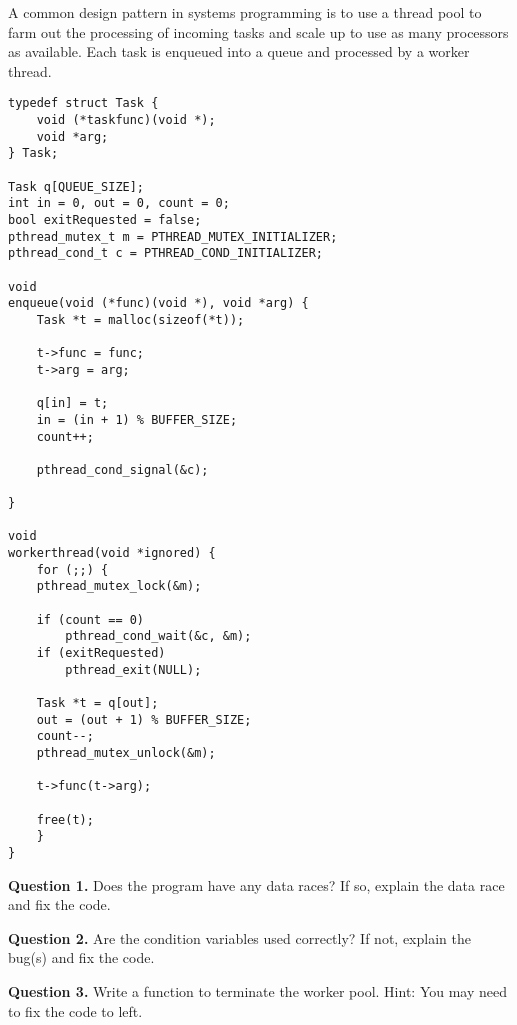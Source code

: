\documentclass[letterpaper,twocolumn,10pt]{article}
\begin{document}
A common design pattern in systems programming is to use a thread pool to farm 
out the processing of incoming tasks and scale up to use as many processors as 
available.  Each task is enqueued into a queue and processed by a worker 
thread.

\begin{lstlisting}[style=CStyle]
typedef struct Task {
    void (*taskfunc)(void *);
    void *arg;
} Task;

Task q[QUEUE_SIZE];
int in = 0, out = 0, count = 0;
bool exitRequested = false;
pthread_mutex_t m = PTHREAD_MUTEX_INITIALIZER;
pthread_cond_t c = PTHREAD_COND_INITIALIZER;

void
enqueue(void (*func)(void *), void *arg) {
    Task *t = malloc(sizeof(*t));

    t->func = func;
    t->arg = arg;

    q[in] = t;
    in = (in + 1) % BUFFER_SIZE;
    count++;

    pthread_cond_signal(&c);

}

void
workerthread(void *ignored) {
    for (;;) {
	pthread_mutex_lock(&m);

	if (count == 0)
	    pthread_cond_wait(&c, &m);
	if (exitRequested)
	    pthread_exit(NULL);

	Task *t = q[out];
	out = (out + 1) % BUFFER_SIZE;
	count--;
	pthread_mutex_unlock(&m);

	t->func(t->arg);

	free(t);
    }
}

\end{lstlisting}

\break

\noindent
\textbf{Question 1.} Does the program have any data races?  If so, explain the 
data race and fix the code.

\vspace{16em}

\noindent
\textbf{Question 2.} Are the condition variables used correctly?  If not, 
explain the bug(s) and fix the code.

\vspace{16em}

\textbf{Question 3.} Write a function to terminate the worker pool.  Hint: You 
may need to fix the code to left.

\vspace{16em}
\end{document}
